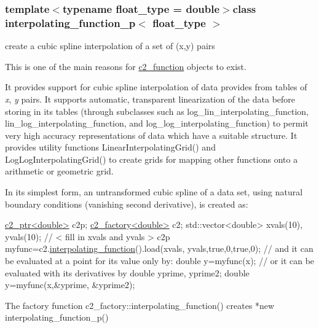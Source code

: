 \subsubsection*{template$<$typename float\-\_\-type = double$>$class interpolating\-\_\-function\-\_\-p$<$ float\-\_\-type $>$}

create a cubic spline interpolation of a set of (x,y) pairs

This is one of the main reasons for \hyperlink{classc2__function}{c2\-\_\-function} objects to exist. 

It provides support for cubic spline interpolation of data provides from tables of {\itshape x}, {\itshape y} pairs. It supports automatic, transparent linearization of the data before storing in its tables (through subclasses such as log\-\_\-lin\-\_\-interpolating\-\_\-function, lin\-\_\-log\-\_\-interpolating\-\_\-function, and log\-\_\-log\-\_\-interpolating\-\_\-function) to permit very high accuracy representations of data which have a suitable structure. It provides utility functions Linear\-Interpolating\-Grid() and Log\-Log\-Interpolating\-Grid() to create grids for mapping other functions onto a arithmetic or geometric grid.

In its simplest form, an untransformed cubic spline of a data set, using natural boundary conditions (vanishing second derivative), is created as\-: \par

\begin{DoxyCode}
    \hyperlink{classc2__ptr}{c2\_ptr<double>} c2p;
    \hyperlink{classc2__factory}{c2\_factory<double>} c2;
std::vector<double> xvals(10), yvals(10); 
\textcolor{comment}{// < fill in xvals and yvals >}
c2p myfunc=c2.\hyperlink{classc2__factory_ab43eaad040801a28019b917c4195b8d5}{interpolating\_function}().load(xvals, yvals,\textcolor{keyword}{true},0,\textcolor{keyword}{true},0);
\textcolor{comment}{// and it can be evaluated at a point for its value only by: }
\textcolor{keywordtype}{double} y=myfunc(x); 
\textcolor{comment}{// or it can be evaluated with its derivatives by}
\textcolor{keywordtype}{double} yprime, yprime2; 
\textcolor{keywordtype}{double} y=myfunc(x,&yprime, &yprime2);
\end{DoxyCode}
 \begin{DoxyVerb}The factory function c2_factory::interpolating_function() creates *new interpolating_function_p()\end{DoxyVerb}
 

